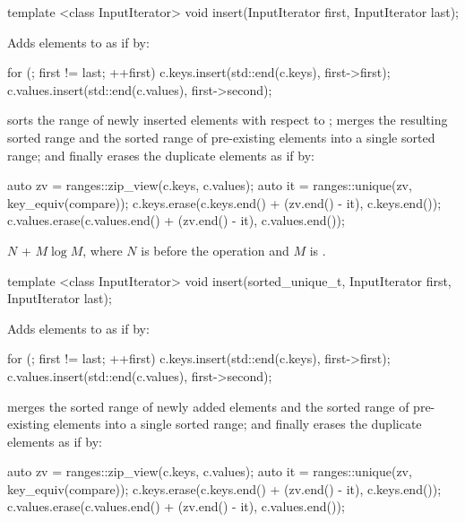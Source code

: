 \begin{addedblock}
%
\begin{itemdecl}
template <class InputIterator>
  void insert(InputIterator first, InputIterator last);
\end{itemdecl}

\begin{itemdescr}
\effects Adds elements to  as if by:
\begin{codeblock}
for (; first != last; ++first) {
  c.keys.insert(std::end(c.keys), first->first);
  c.values.insert(std::end(c.values), first->second);
}
\end{codeblock}
sorts the range of newly inserted elements with respect
to ; merges the resulting sorted range and the sorted
range of pre-existing elements into a single sorted range; and finally erases
the duplicate elements as if by:
\begin{codeblock}
auto zv = ranges::zip_view(c.keys, c.values);
auto it = ranges::unique(zv, key_equiv(compare));
c.keys.erase(c.keys.end() + (zv.end() - it), c.keys.end());
c.values.erase(c.values.end() + (zv.end() - it), c.values.end());
\end{codeblock}

\pnum
\complexity
$N$ + $M \log M$, where $N$ is  before the operation and $M$
is .
\end{itemdescr}

%
\begin{itemdecl}
template <class InputIterator>
  void insert(sorted_unique_t, InputIterator first, InputIterator last);
\end{itemdecl}

\begin{itemdescr}
\effects Adds elements to  as if by:
\begin{codeblock}
for (; first != last; ++first) {
  c.keys.insert(std::end(c.keys), first->first);
  c.values.insert(std::end(c.values), first->second);
}
\end{codeblock}
merges the sorted range of newly added elements and the sorted range of
pre-existing elements into a single sorted range; and finally
erases the duplicate elements as if by:
\begin{codeblock}
auto zv = ranges::zip_view(c.keys, c.values);
auto it = ranges::unique(zv, key_equiv(compare));
c.keys.erase(c.keys.end() + (zv.end() - it), c.keys.end());
c.values.erase(c.values.end() + (zv.end() - it), c.values.end());
\end{codeblock}


\end{itemdescr}
\end{addedblock}

